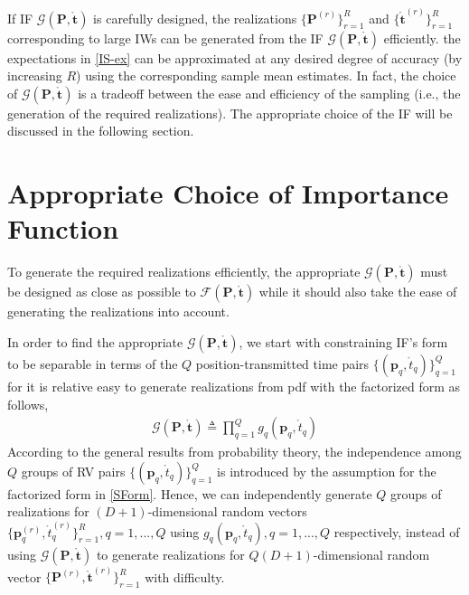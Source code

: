 \documentclass[review]{elsarticle}
\begin{document}
If IF $\mathcal{G}(\boldsymbol{P},\mathring{\boldsymbol{t}})$ is carefully designed, the realizations $\lbrace \boldsymbol{P}^{(r)}\rbrace_{r=1}^R$ and $\lbrace \mathring{\boldsymbol{t}}^{(r)}\rbrace_{r=1}^R$ corresponding to large IWs can be generated from the IF $\mathcal{G}(\boldsymbol{P},\mathring{\boldsymbol{t}})$ efficiently. the expectations in \eqref{IS-ex} can be approximated at any desired degree of accuracy (by increasing $R$) using the corresponding sample mean estimates.
In fact, the choice of $\mathcal{G}(\boldsymbol{P},\mathring{\boldsymbol{t}})$ is a tradeoff between the ease and efficiency of the sampling (i.e., the generation of the required realizations). The appropriate choice of the IF will be discussed in the following section. 

\section{Appropriate Choice of Importance Function}
To generate the required realizations efficiently, the appropriate $\mathcal{G}(\boldsymbol{P},\mathring{\boldsymbol{t}})$ must be designed as close as possible to $\mathcal{F}(\boldsymbol{P},\mathring{\boldsymbol{t}})$ while it should also take the ease of generating the realizations into account. 

In order to find the appropriate $\mathcal{G}(\boldsymbol{P},\mathring{\boldsymbol{t}})$, we start with constraining IF's form to be separable in terms of the $Q$ position-transmitted time pairs $\lbrace(\boldsymbol{p}_q,\mathring{t}_q)\rbrace_{q=1}^Q$ for it is relative easy to generate realizations from pdf with the factorized form as follows,
\begin{align}\label{SForm}
    \mathcal{G}(\boldsymbol{P},\mathring{\boldsymbol{t}})\triangleq \prod_{q=1}^Q g_q(\boldsymbol{p}_q,\mathring{t}_q)
\end{align}
According to the general results from probability theory, the independence among $Q$ groups of RV pairs $\lbrace(\boldsymbol{p}_q,\mathring{t}_q)\rbrace_{q=1}^Q$ is introduced by the assumption for the factorized form in \eqref{SForm}. Hence, we can independently generate $Q$ groups of realizations for $(D+1)$-dimensional random vectors $\lbrace\boldsymbol{p}_q^{(r)},\mathring{t}_q^{(r)}\rbrace_{r=1}^{R},q=1,...,Q$ using $g_q(\boldsymbol{p}_q,\mathring{t}_q),q=1,...,Q$ respectively, instead of using $\mathcal{G}(\boldsymbol{P},\mathring{\boldsymbol{t}})$ to generate realizations for $Q(D+1)$-dimensional random vector $\lbrace\boldsymbol{P}^{(r)},\mathring{\boldsymbol{t}}^{(r)}\rbrace_{r=1}^{R}$ with difficulty. 
\end{document}
